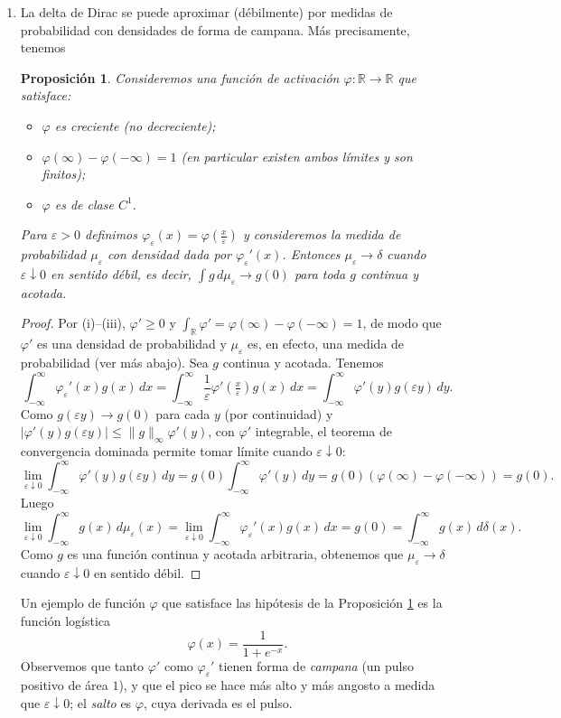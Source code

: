 \documentclass[12pt, a4paper]{amsbook}
\newcommand{\ve}{\varepsilon}
\newcommand{\R}{{\mathbb R}}
\newtheorem{prop}[teo]{Proposici\'on}
\theoremstyle{remark}
\theoremstyle{definition}
\numberwithin{section}{chapter}
\numberwithin{subsection}{section}
\numberwithin{equation}{section}
\numberwithin{figure}{chapter}
\begin{document}
\begin{enumerate}
\item La delta de Dirac se puede aproximar (débilmente) por medidas de probabilidad con densidades de forma de campana. Más precisamente, tenemos
\begin{prop}\label{prop.ve.delta}
Consideremos una función de activación $\varphi\colon\R\to\R$ que satisface:
\begin{itemize}
\item[(i)] $\varphi$ es creciente (no decreciente);
\item[(ii)] $\varphi(\infty) - \varphi(-\infty)=1$ (en particular existen ambos límites y son finitos);
\item[(iii)] $\varphi$ es de clase $C^1$.
\end{itemize}
Para $\ve>0$ definimos $\varphi_\ve(x) = \varphi(\frac{x}{\ve})$ y consideremos la medida de probabilidad $\mu_\ve$ con densidad dada por $\varphi_\ve'(x)$. Entonces $\mu_\ve\to\delta$ cuando $\ve\downarrow 0$ en sentido débil, es decir, $\int g\,d\mu_\ve\to g(0)$ para toda $g$ continua y acotada.
\end{prop}
\begin{proof}
Por (i)--(iii), $\varphi'\ge0$ y $\int_\R\varphi'=\varphi(\infty)-\varphi(-\infty)=1$, de modo que $\varphi'$ es una densidad de probabilidad y $\mu_\ve$ es, en efecto, una medida de probabilidad (ver más abajo). Sea $g$ continua y acotada. Tenemos
$$
\int_{-\infty}^\infty \varphi_\ve'(x) g(x)\, dx = \int_{-\infty}^\infty \frac{1}{\ve}\varphi'(\tfrac{x}{\ve}) g(x)\, dx = \int_{-\infty}^\infty \varphi'(y) g(\ve y)\, dy.
$$
Como $g(\ve y)\to g(0)$ para cada $y$ (por continuidad) y $|\varphi'(y)g(\ve y)|\le \|g\|_\infty\varphi'(y)$, con $\varphi'$ integrable, el teorema de convergencia dominada permite tomar límite cuando $\ve\downarrow 0$:
$$
\lim_{\ve\downarrow 0} \int_{-\infty}^\infty \varphi'(y) g(\ve y)\, dy = g(0) \int_{-\infty}^\infty \varphi'(y)\, dy = g(0)(\varphi(\infty) - \varphi(-\infty)) = g(0).
$$
Luego
$$
\lim_{\ve\downarrow 0}\int_{-\infty}^\infty  g(x)\, d\mu_\ve(x) = \lim_{\ve\downarrow 0}\int_{-\infty}^\infty \varphi_\ve'(x) g(x)\, dx  = g(0) = \int_{-\infty}^\infty g(x)\, d\delta(x). 
$$
Como $g$ es una función continua y acotada arbitraria, obtenemos que $\mu_\ve\to\delta$ cuando $\ve\downarrow 0$ en sentido débil.
\end{proof}

Un ejemplo de función $\varphi$ que satisface las hipótesis de la Proposición \ref{prop.ve.delta} es la función logística
$$
\varphi(x) = \frac{1}{1+e^{-x}}.
$$
Observemos que tanto $\varphi'$ como $\varphi_\ve'$ tienen forma de {\em campana} (un pulso positivo de área $1$), y que el pico se hace más alto y más angosto a medida que $\ve\downarrow 0$; el {\em salto} es $\varphi$, cuya derivada es el pulso.


\end{enumerate}
\end{document}
